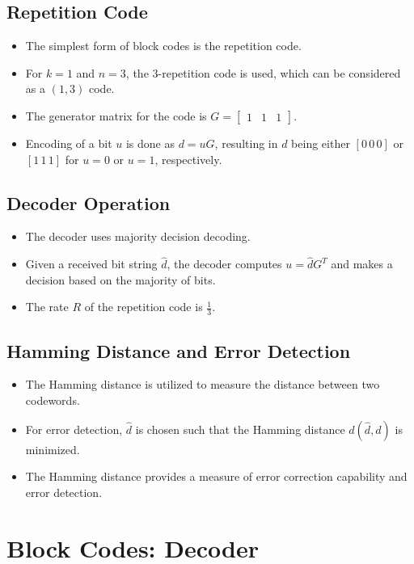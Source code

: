\subsection*{Repetition Code}
\begin{itemize}
    \item The simplest form of block codes is the repetition code.
    \item For \( k = 1 \) and \( n = 3 \), the \( 3 \)-repetition code is used, which can be considered as a \( (1,3) \) code.
    \item The generator matrix for the code is \( G = \begin{bmatrix} 1 & 1 & 1 \end{bmatrix} \).
    \item Encoding of a bit \( u \) is done as \( d = uG \), resulting in \( d \) being either \( [0 \, 0 \, 0] \) or \( [1 \, 1 \, 1] \) for \( u = 0 \) or \( u = 1 \), respectively.
\end{itemize}

\subsection*{Decoder Operation}
\begin{itemize}
    \item The decoder uses majority decision decoding.
    \item Given a received bit string \( \hat{d} \), the decoder computes \( u = \hat{d} G^T \) and makes a decision based on the majority of bits.
    \item The rate \( R \) of the repetition code is \( \frac{1}{3} \).
\end{itemize}

\subsection*{Hamming Distance and Error Detection}
\begin{itemize}
    \item The Hamming distance is utilized to measure the distance between two codewords.
    \item For error detection, \( \hat{d} \) is chosen such that the Hamming distance \( d(\hat{d},d) \) is minimized.
    \item The Hamming distance provides a measure of error correction capability and error detection.
\end{itemize}


\section*{Block Codes: Decoder}

